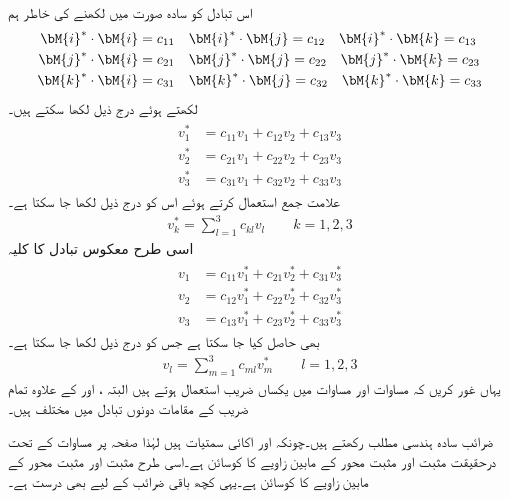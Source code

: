 اس تبادل کو سادہ صورت میں لکھنے کی خاطر ہم
\begin{gather}
\begin{aligned}\label{مساوات_الاحصاء_عددی_سر}
\bM{i}^*\cdot \bM{i}&=c_{11}\quad \bM{i}^*\cdot \bM{j}=c_{12} \quad \bM{i}^*\cdot \bM{k}=c_{13}\\
\bM{j}^*\cdot \bM{i}&=c_{21}\quad \bM{j}^*\cdot \bM{j}=c_{22} \quad \bM{j}^*\cdot \bM{k}=c_{23}\\
\bM{k}^*\cdot \bM{i}&=c_{31}\quad \bM{k}^*\cdot \bM{j}=c_{32} \quad \bM{k}^*\cdot \bM{k}=c_{33}
\end{aligned}
\end{gather} 
لکھتے ہوئے درج ذیل لکھا سکتے ہیں۔
\begin{gather}
\begin{aligned}\label{مساوات_الاحصاء_تبادل_نظام_الف}
v_1^*&=c_{11}v_1+c_{12}v_2+c_{13}v_3\\
v_2^*&=c_{21}v_1+c_{22}v_2+c_{23}v_3\\
v_3^*&=c_{31}v_1+c_{32}v_2+c_{33}v_3
\end{aligned}
\end{gather} 
علامت جمع استعمال کرتے ہوئے اس کو درج ذیل لکھا جا سکتا ہے۔
\begin{align}\label{مساوات_الاحصاء_تبادل_نظام_ب}
v_k^*=\sum_{l=1}^3 c_{kl} v_l \quad \quad k=1,2,3
\end{align} 
اسی طرح  معکوس  تبادل کا کلیہ
\begin{gather}
\begin{aligned}\label{مساوات_الاحصاء_تبادل_نظام_پ}
v_1&=c_{11}v_1^*+c_{21}v_2^*+c_{31}v_3^*\\
v_2&=c_{12}v_1^*+c_{22}v_2^*+c_{32}v_3^*\\
v_3&=c_{13}v_1^*+c_{23}v_2^*+c_{33}v_3^*
\end{aligned}
\end{gather} 
 بھی حاصل کیا جا سکتا ہے جس کو درج ذیل لکھا جا سکتا ہے۔
\begin{align}\label{مساوات_الاحصاء_تبادل_نظام_ت}
v_l=\sum_{m=1}^3 c_{ml} v_m^* \quad \quad l=1,2,3
\end{align}
یہاں غور کریں کہ مساوات  اور مساوات  میں یکساں  ضریب   استعمال ہوتے ہیں البتہ ،  اور  کے علاوہ تمام  ضریب  کے مقامات دونوں تبادل میں مختلف ہیں۔

ضرائب   سادہ ہندسی مطلب  رکھتے ہیں۔چونکہ  اور  اکائی سمتیات ہیں لہٰذا صفحہ  پر مساوات  کے تحت  درحقیقت مثبت  اور مثبت محور    کے مابین زاویے کا کوسائن  ہے۔اسی طرح  مثبت  اور مثبت محور  کے مابین زاویے کا کوسائن ہے۔یہی کچھ باقی ضرائب کے لیے بھی درست ہے۔

